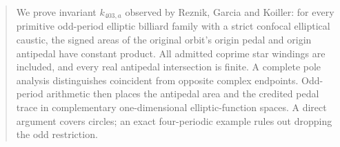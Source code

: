 \begin{abstract}
We prove invariant $k_{403,a}$ observed by Reznik, Garcia and Koiller:
for every primitive odd-period elliptic billiard family with a strict
confocal elliptical caustic, the signed areas of the original orbit's
origin pedal and origin antipedal have constant product. All admitted
coprime star windings are included, and every real antipedal intersection
is finite. A complete pole analysis distinguishes coincident from
opposite complex endpoints. Odd-period arithmetic then places the
antipedal area and the credited pedal trace in complementary
one-dimensional elliptic-function spaces. A direct argument covers
circles; an exact four-periodic example rules out dropping the odd
restriction.
\end{abstract}
